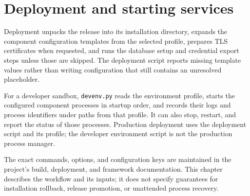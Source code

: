 \section{Deployment and starting services}
\label{sec:build_release_deployment:deploy}

Deployment unpacks the release into its installation directory, expands the
component configuration templates from the selected profile, prepares TLS
certificates when requested, and runs the database setup and credential
export steps unless those are skipped. The deployment script reports missing
template values rather than writing configuration that still contains an
unresolved placeholder.

For a developer sandbox, \texttt{devenv.py} reads the environment profile,
starts the configured component processes in startup order, and records their
logs and process identifiers under paths from that profile. It can also stop,
restart, and report the status of those processes. Production deployment uses
the deployment script and its profile; the developer environment script is
not the production process manager.

The exact commands, options, and configuration keys are maintained in the
project's build, deployment, and framework documentation. This chapter
describes the workflow and its inputs; it does not specify guarantees for
installation rollback, release promotion, or unattended process recovery.
